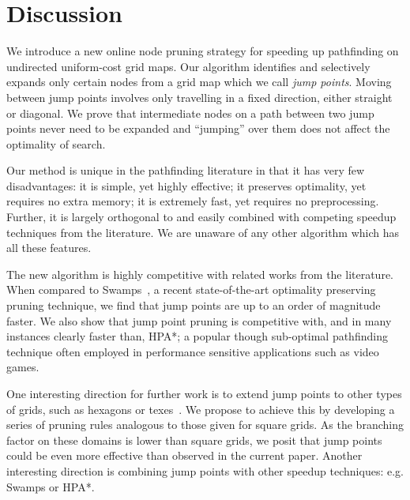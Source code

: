 \section{Discussion}
\label{cha::jps::discussion}
We introduce a new online node pruning strategy for speeding
up pathfinding on undirected uniform-cost grid maps.  Our algorithm identifies
and selectively expands only certain nodes from a grid map which we call
\emph{jump points}.  Moving between jump points involves only travelling in a
fixed direction, either straight or diagonal.  We prove that intermediate nodes
on a path between two jump points never need to be expanded and ``jumping'' over
them does not affect the optimality of search.
\par
Our method is unique in the pathfinding literature in that it has very few
disadvantages: it is simple, yet highly effective; it preserves optimality, yet
requires no extra memory;  it is extremely fast, yet requires no preprocessing.
Further, it is largely orthogonal to and easily combined with 
competing speedup techniques from the literature.
We are unaware of any other algorithm which has all these features.
\par
The new algorithm is highly competitive with related works from the literature.
When compared to Swamps~\cite{pochter10}, 
a recent state-of-the-art optimality preserving pruning
technique, we find that jump points are up to an order of magnitude faster.
We also show that jump point pruning is competitive with, and in
many instances clearly faster than, HPA*; a popular though sub-optimal pathfinding
technique often employed in performance sensitive applications such as
video games.
\par
One interesting direction for further work is to extend jump points to other
types of grids, such as hexagons or texes~\cite{yap02}.
We propose to achieve this by developing  a series of pruning rules analogous 
to those given for square grids. 
As the branching factor on these domains is lower than square grids, we posit
that jump points could be even more effective than observed in the current paper.
Another interesting direction is combining jump points with other
speedup techniques: e.g. Swamps or HPA*.
